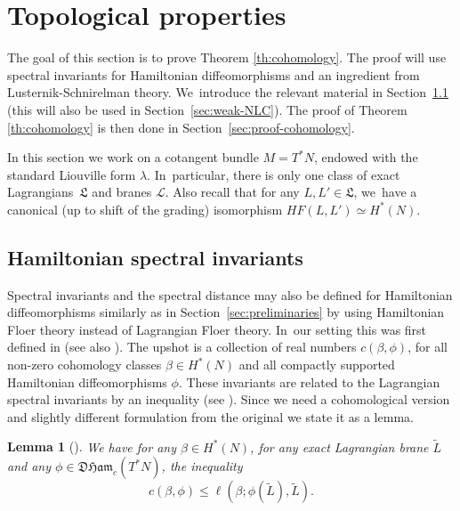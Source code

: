 \documentclass[JEP,XML,SOM,Unicode,NoFloatCountersInSection,published]{cedram}
\newtheorem{lem}[thm]{Lemma}
\theoremstyle{definition}
\newcommand {\LL}{{\mathcal L}}
\newcommand{\DHam}{\mathfrak{DHam}}
\newcommand{\fL}{\mathfrak {L}}
\begin{document}
\section{Topological properties}\label{sec:topological-properties}

The goal of this section is to prove Theorem \ref{th:cohomology}. The proof will use spectral invariants for Hamiltonian diffeomorphisms and an ingredient from Lusternik-Schnirelman theory. We~introduce the relevant material in Section~\ref{sec:Hamiltonian-spectral-invariants} (this will also be used in Section~\ref{sec:weak-NLC}). The proof of Theorem \ref{th:cohomology} is then done in Section~\ref{sec:proof-cohomology}.

In this section we work on a cotangent bundle $M=T^*N$, endowed with the standard Liouville form $\lambda$. In~particular, there is only one class of exact Lagrangians~$\fL$ and branes $\LL$. Also recall that for any $L, L'\in\fL$, we~have a canonical (up to shift of the grading) isomorphism $HF(L,L')\simeq H^*(N)$.

\subsection{Hamiltonian spectral invariants}\label{sec:Hamiltonian-spectral-invariants}

Spectral invariants and the spectral distance may also be defined for Hamiltonian diffeomorphisms similarly as in Section~\ref{sec:preliminaries} by using Hamiltonian Floer theory instead of Lagrangian Floer theory. In~our setting this was first defined in \cite{Frauenfelder-Schlenk} (see also \cite{Lanzat}). The upshot is a collection of real numbers $c(\beta, \phi)$, for all non-zero cohomology classes $\beta\in H^*(N)$ and all compactly supported Hamiltonian diffeomorphisms $\phi$. These invariants are related to the Lagrangian spectral invariants by an inequality (see \cite[Prop.\,2.14]{M-V-Z}). Since we need a cohomological version and slightly different formulation from the original we state it as a lemma.

\begin{lem}[\cite{M-V-Z}]
We have for any $\beta \in H^*(N)$, for any exact Lagrangian brane $\tilde L$ and any $\phi\in\DHam_c(T^*N)$, the inequality
\begin{equation}\label{eq:Lagrangian-Hamiltonian-spectral-invariants}
c(\beta, \phi)\leq \ell(\beta;\phi(\tilde L), \tilde L).
\end{equation}
\end{lem}
\end{document}

